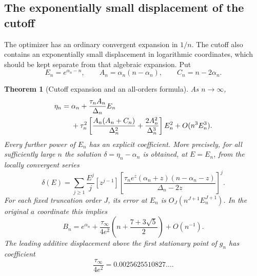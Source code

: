 \documentclass[11pt,a4paper]{article}
\newtheorem{theorem}{Theorem}[section]
\theoremstyle{definition}
\theoremstyle{remark}
\numberwithin{equation}{section}
\begin{document}
\subsection{The exponentially small displacement of the cutoff}
The optimizer has an ordinary convergent expansion in $1/n$. The
cutoff also contains an exponentially small displacement in logarithmic
coordinates, which should be kept separate from that algebraic expansion.
Put
\[
 E_n=e^{\alpha_n-n},\qquad A_n=\alpha_n(n-\alpha_n),
 \qquad C_n=n-2\alpha_n.
\]

\begin{theorem}[Cutoff expansion and an all-orders formula]
\label{opt:thm:cutoff-expansion}
As $n\to\infty$,
\begin{align}
 \eta_n={}&\alpha_n+
 \frac{\tau_nA_n}{\Delta_n}E_n\notag\\
 &+\tau_n^2\left[
 \frac{A_n(A_n+C_n)}{\Delta_n^2}
 +\frac{2A_n^2}{\Delta_n^3}\right]E_n^2
 +O(n^3E_n^3).\label{opt:eq:eta-two-sectors}
\end{align}
Every further power of $E_n$ has an explicit coefficient. More precisely,
for all sufficiently large $n$ the solution $\delta=\eta_n-\alpha_n$
is obtained, at $E=E_n$, from the locally convergent series
\begin{equation}\label{opt:eq:eta-Lagrange}
 \delta(E)=\sum_{j\geq1}\frac{E^j}{j}[z^{j-1}]
 \left[
 \frac{\tau_ne^z(\alpha_n+z)(n-\alpha_n-z)}{\Delta_n-2z}
 \right]^j.
\end{equation}
For each fixed truncation order $J$, its error at $E_n$ is
$O_J(n^{J+1}E_n^{J+1})$.
In the original $a$ coordinate this implies
\begin{equation}\label{opt:eq:B-asymptotic}
 B_n=e^{\alpha_n}+
 \frac{\tau_\infty}{4e^2}
 \left(n+\frac{7+3\sqrt5}{2}\right)+O(n^{-1}).
\end{equation}
The leading additive displacement above the first stationary point
of $g_n$ has coefficient
\[
 \frac{\tau_\infty}{4e^2}=0.0025625510827\ldots.
\]
\end{theorem}
\end{document}
